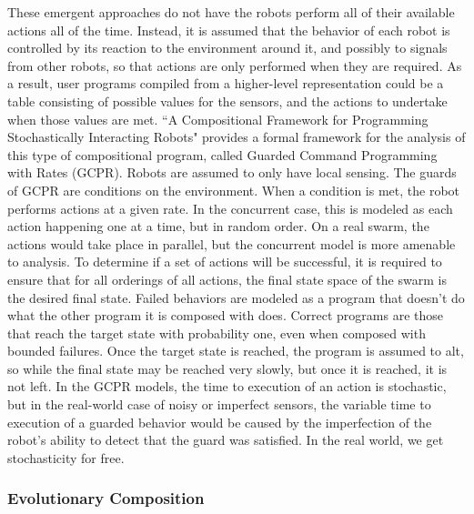 \documentclass[]{article}
\begin{document}
These emergent approaches do not have the robots perform all of their available actions all of the time. 
Instead, it is assumed that the behavior of each robot is controlled by its reaction to the environment around it, and possibly to signals from other robots, so that actions are only performed when they are required. 
As a result, user programs compiled from a higher-level representation could be a table consisting of possible values for the sensors, and the actions to undertake when those values are met.
``A Compositional Framework for Programming Stochastically Interacting Robots" \cite{napp2011compositional} provides a formal framework for the analysis of this type of compositional program, called Guarded Command Programming with Rates (GCPR). 
Robots are assumed to only have local sensing.
The guards of GCPR are conditions on the environment.
When a condition is met, the robot performs actions at a given rate. 
In the concurrent case, this is modeled as each action happening one at a time, but in random order. 
On a real swarm, the actions would take place in parallel, but the concurrent model is more amenable to analysis. 
To determine if a set of actions will be successful, it is required to ensure that for all orderings of all actions, the final state space of the swarm is the desired final state. 
Failed behaviors are modeled as a program that doesn't do what the other program it is composed with does. 
Correct programs are those that reach the target state with probability one, even when composed with bounded failures. 
Once the target state is reached, the program is assumed to alt, so while the final state may be reached very slowly, but once it is reached, it is not left. 
In the GCPR models, the time to execution of an action is stochastic, but in the real-world case of noisy or imperfect sensors, the variable time to execution of a guarded behavior would be caused by the imperfection of the robot's ability to detect that the guard was satisfied. 
In the real world, we get stochasticity for free. 


\subsubsection{Evolutionary Composition}
\end{document}
